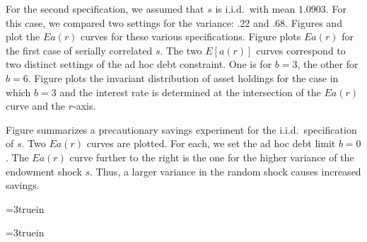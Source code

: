  For the second specification, we assumed that $s$ is i.i.d.\ with
mean $1.0903$. For this case, we compared two settings for
the variance: .22 and .68.
Figures  %
 and
 plot the $Ea(r)$ curves for these various
specifications.
  Figure  %
  plots $E a(r)$ for the first case of serially
correlated $s$.  The two $E [a(r)]$ curves correspond to
two distinct settings of the ad hoc debt constraint.
One is for $b=3$, the other for $b=6$.
Figure  %
plots the invariant distribution of asset holdings
for the case in which $b=3$ and  the interest rate is determined at the
intersection of the $Ea(r)$ curve and the $r$-axis.

  Figure  %
   summarizes a precautionary savings experiment for
the i.i.d.\ specification of $s$.  Two $E a(r)$ curves are
plotted. For each, we set the ad hoc debt limit $b=0$.  The
$E a(r)$ curve further to the right is the one for the higher
variance of the endowment shock $s$.  Thus, a larger variance in
the random shock causes increased savings.









\centerline{\epsfxsize=3truein}
\caption{Two $E a(r)$ curves when $b=0$ and the endowment shock $s$ is i.i.d.\
but with different variances; the curve with circles belongs to the economy with
the higher variance.}
\endfigure

\centerline{\epsfxsize=3truein}
\caption{The invariant distribution of capital when $b=3$.}
\endfigure

